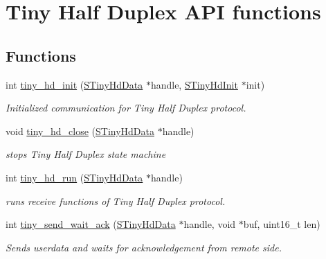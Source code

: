 \hypertarget{group__HALF__DUPLEX__API}{}\section{Tiny Half Duplex A\+PI functions}
\label{group__HALF__DUPLEX__API}
\subsection*{Functions}
\begin{DoxyCompactItemize}
\item 
int \hyperlink{group__HALF__DUPLEX__API_ga747e6a3a0b5d2a9e1fe0c143c20057e9}{tiny\+\_\+hd\+\_\+init} (\hyperlink{tiny__hd_8h_af9f81ad129b754a780dfca5dcd7f7cf9}{S\+Tiny\+Hd\+Data} $\ast$handle, \hyperlink{tiny__hd_8h_a784f1a0f0ae7f06da4bc288fa3f22408}{S\+Tiny\+Hd\+Init} $\ast$init)
\begin{DoxyCompactList}\small\item\em Initialized communication for Tiny Half Duplex protocol. \end{DoxyCompactList}\item 
void \hyperlink{group__HALF__DUPLEX__API_ga275846730a88b9654345d5defbda31e7}{tiny\+\_\+hd\+\_\+close} (\hyperlink{tiny__hd_8h_af9f81ad129b754a780dfca5dcd7f7cf9}{S\+Tiny\+Hd\+Data} $\ast$handle)
\begin{DoxyCompactList}\small\item\em stops Tiny Half Duplex state machine \end{DoxyCompactList}\item 
int \hyperlink{group__HALF__DUPLEX__API_gac962595f09883dea1dd0992a608a17b9}{tiny\+\_\+hd\+\_\+run} (\hyperlink{tiny__hd_8h_af9f81ad129b754a780dfca5dcd7f7cf9}{S\+Tiny\+Hd\+Data} $\ast$handle)
\begin{DoxyCompactList}\small\item\em runs receive functions of Tiny Half Duplex protocol. \end{DoxyCompactList}\item 
int \hyperlink{group__HALF__DUPLEX__API_ga5aad8dcb504b80bac923496f2686a6d6}{tiny\+\_\+send\+\_\+wait\+\_\+ack} (\hyperlink{tiny__hd_8h_af9f81ad129b754a780dfca5dcd7f7cf9}{S\+Tiny\+Hd\+Data} $\ast$handle, void $\ast$buf, uint16\+\_\+t len)
\begin{DoxyCompactList}\small\item\em Sends userdata and waits for acknowledgement from remote side. \end{DoxyCompactList}\end{DoxyCompactItemize}


